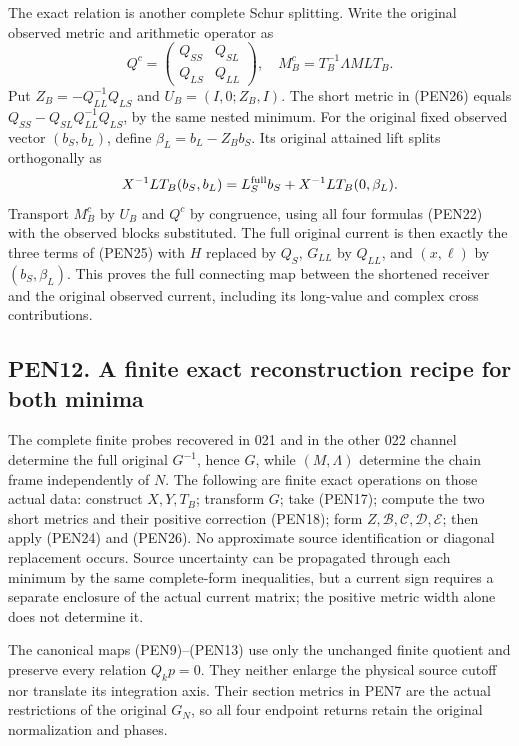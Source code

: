 \documentclass[11pt]{article}
\begin{document}
The exact relation is another complete Schur splitting. Write the original observed metric and arithmetic operator as \[
Q^c=\begin{pmatrix}Q_{SS}&Q_{SL}\\Q_{LS}&Q_{LL}\end{pmatrix},\quad
M_B^c=T_B^{-1}\Lambda ML T_B.
\] Put \(Z_B=-Q_{LL}^{-1}Q_{LS}\) and \(U_B=(I,0;Z_B,I)\). The short metric in (PEN26) equals \(Q_{SS}-Q_{SL}Q_{LL}^{-1}Q_{LS}\), by the same nested minimum. For the original fixed observed vector \((b_S,b_L)\), define \(\beta_L=b_L-Z_Bb_S\). Its original attained lift splits orthogonally as \[
X^{-1}LT_B(b_S,b_L)
=L_S^{\rm full}b_S+X^{-1}LT_B(0,\beta_L).
\] Transport \(M_B^c\) by \(U_B\) and \(Q^c\) by congruence, using all four formulas (PEN22) with the observed blocks substituted. The full original current is then exactly the three terms of (PEN25) with \(H\) replaced by \(Q_S\), \(G_{LL}\) by \(Q_{LL}\), and \((x,\ell)\) by \((b_S,\beta_L)\). This proves the full connecting map between the shortened receiver and the original observed current, including its long-value and complex cross contributions.

\subsection{PEN12. A finite exact reconstruction recipe for both minima}\label{pen12.-a-finite-exact-reconstruction-recipe-for-both-minima}

The complete finite probes recovered in 021 and in the other 022 channel determine the full original \(G^{-1}\), hence \(G\), while \((M,\Lambda)\) determine the chain frame independently of \(N\). The following are finite exact operations on those actual data: construct \(X,Y,T_B\); transform \(G\); take (PEN17); compute the two short metrics and their positive correction (PEN18); form \(Z,\mathcal B,\mathcal C,\mathcal D,\mathcal E\); then apply (PEN24) and (PEN26). No approximate source identification or diagonal replacement occurs. Source uncertainty can be propagated through each minimum by the same complete-form inequalities, but a current sign requires a separate enclosure of the actual current matrix; the positive metric width alone does not determine it.

The canonical maps (PEN9)--(PEN13) use only the unchanged finite quotient and preserve every relation \(Q_kp=0\). They neither enlarge the physical source cutoff nor translate its integration axis. Their section metrics in PEN7 are the actual restrictions of the original \(G_N\), so all four endpoint returns retain the original normalization and phases.
\end{document}
